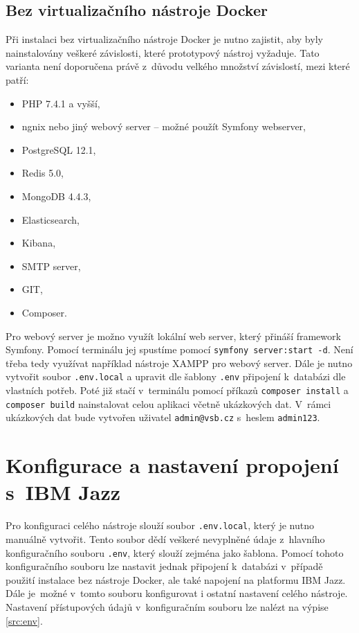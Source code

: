 \documentclass[czech,master]{diploma}
\begin{document}
\section{Bez virtualizačního nástroje Docker}
Při instalaci bez virtualizačního nástroje Docker je nutno zajistit, aby byly nainstalovány veškeré závislosti, které prototypový nástroj vyžaduje. Tato varianta není doporučena právě z~důvodu velkého množství závislostí, mezi které patří:
\begin{itemize}
\item PHP 7.4.1 a vyšší,
\item ngnix nebo jiný webový server -- možné použít Symfony webserver,
\item PostgreSQL 12.1,
\item Redis 5.0,
\item MongoDB 4.4.3,
\item Elasticsearch,
\item Kibana,
\item SMTP server,
\item GIT,
\item Composer.
\end{itemize}

Pro webový server je možno využít lokální web server, který přináší framework Symfony. Pomocí terminálu jej spustíme pomocí \texttt{symfony server:start -d}. Není třeba tedy využívat například nástroje XAMPP pro webový server. Dále je nutno vytvořit soubor \texttt{.env.local} a upravit dle šablony \texttt{.env} připojení k~databázi dle vlastních potřeb. Poté již stačí v~terminálu pomocí příkazů \texttt{composer install} a \texttt{composer build} nainstalovat celou aplikaci včetně ukázkových dat. V~rámci ukázkových dat bude vytvořen uživatel \texttt{admin@vsb.cz} s~heslem \texttt{admin123}.

\chapter{Konfigurace a nastavení propojení s~IBM Jazz}
\label{sec:config_jazz}
Pro konfiguraci celého nástroje slouží soubor \texttt{.env.local}, který je nutno manuálně vytvořit. Tento soubor dědí veškeré nevyplněné údaje z~hlavního konfiguračního souboru \texttt{.env}, který slouží zejména jako šablona. Pomocí tohoto konfiguračního souboru lze nastavit jednak připojení k~databázi v~případě použití instalace bez nástroje Docker, ale také napojení na platformu IBM Jazz. Dále je~možné v~tomto souboru konfigurovat i ostatní nastavení celého nástroje. Nastavení přístupových údajů v~konfiguračním souboru lze nalézt na výpise \ref{src:env}.
\end{document}
